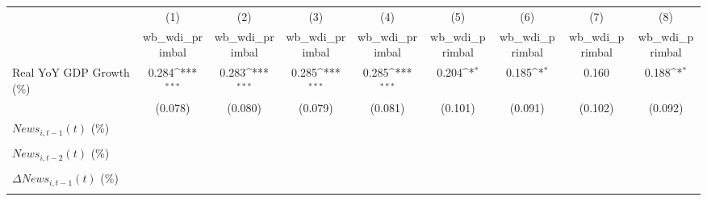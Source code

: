 {
\def\sym#1{\ifmmode^{#1}\else\(^{#1}\)\fi}
\begin{tabular}{l*{8}{c}}
\toprule
                    &\multicolumn{1}{c}{(1)}&\multicolumn{1}{c}{(2)}&\multicolumn{1}{c}{(3)}&\multicolumn{1}{c}{(4)}&\multicolumn{1}{c}{(5)}&\multicolumn{1}{c}{(6)}&\multicolumn{1}{c}{(7)}&\multicolumn{1}{c}{(8)}\\
                    &\multicolumn{1}{c}{wb_wdi_primbal}&\multicolumn{1}{c}{wb_wdi_primbal}&\multicolumn{1}{c}{wb_wdi_primbal}&\multicolumn{1}{c}{wb_wdi_primbal}&\multicolumn{1}{c}{wb_wdi_primbal}&\multicolumn{1}{c}{wb_wdi_primbal}&\multicolumn{1}{c}{wb_wdi_primbal}&\multicolumn{1}{c}{wb_wdi_primbal}\\
\midrule
Real YoY GDP Growth (\%)&       0.284\sym{***}&       0.283\sym{***}&       0.285\sym{***}&       0.285\sym{***}&       0.204\sym{*}  &       0.185\sym{*}  &       0.160         &       0.188\sym{*}  \\
                    &     (0.078)         &     (0.080)         &     (0.079)         &     (0.081)         &     (0.101)         &     (0.091)         &     (0.102)         &     (0.092)         \\
\addlinespace
$ News_{i,t-1}(t)$ (\%)&                     &                     &                     &                     &                     &                     &                     &                     \\
                    &                     &                     &                     &                     &                     &                     &                     &                     \\
\addlinespace
$ News_{i,t-2}(t)$ (\%)&                     &                     &                     &                     &                     &                     &                     &                     \\
                    &                     &                     &                     &                     &                     &                     &                     &                     \\
\addlinespace
$ \Delta News_{i,t-1}(t)$ (\%)&                     &                     &                     &                     &                     &                     &                     &                     \\
                    &                     &                     &                     &                     &                     &                     &                     &                     \\

\end{tabular}}
